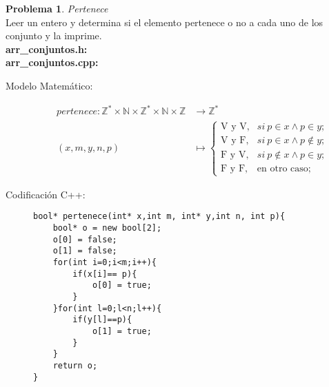 \documentclass{article}
\theoremstyle{plain}
\theoremstyle{definition}
\newtheorem{problem}{Problema}
\begin{document}
\begin{problem} \emph{Pertenece}\\
Leer un entero y determina si el elemento pertenece o no a cada uno de los conjunto y la imprime.\\
\textbf{arr\_conjuntos.h:}\ \\
\textbf{arr\_conjuntos.cpp:}\ 
%
\begin{description}
\item[Modelo Matemático:]
%
\begin{align*}
pertenece: \mathbb{Z}^*\times\mathbb{N}\times\mathbb{Z}^*\times\mathbb{N}\times\mathbb{Z} &\to \mathbb{Z}^*\\
(x,m,y,n,p) &\mapsto 
\begin{cases}
\text{V y V},& si\ p \in x \wedge p \in y;\\
\text{V y F},& si\ p \in x \wedge p \not\in y;\\
\text{F y V},& si\ p \not\in x \wedge p \in y;\\
\text{F y F},& \text{en otro caso;}
\end{cases}
\end{align*}
%
\item[Codificación \textsf{C++}:]\hfill
%
\begin{verbatim}
bool* pertenece(int* x,int m, int* y,int n, int p){
    bool* o = new bool[2];
    o[0] = false;
    o[1] = false;
    for(int i=0;i<m;i++){
        if(x[i]== p){
            o[0] = true;
        }
    }for(int l=0;l<n;l++){
        if(y[l]==p){
            o[1] = true;
        }
    }
    return o;
}
\end{verbatim}
\end{description}
\end{problem}
\end{document}
